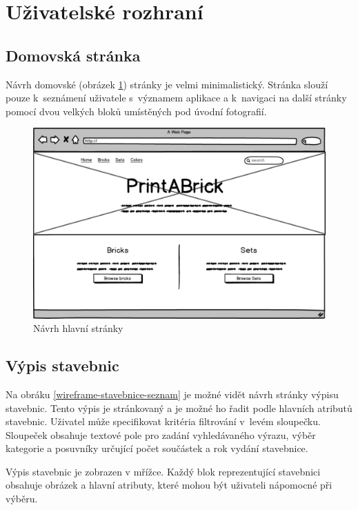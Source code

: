 \section{Uživatelské rozhraní}


\subsection{Domovská stránka}
Návrh domovské (obrázek \ref{wireframe-hlavni}) stránky je velmi minimalistický. Stránka slouží pouze k~seznámení uživatele s~významem aplikace a k~navigaci na další stránky pomocí dvou velkých bloků umístěných pod úvodní fotografií.

\begin{figure}[htbp]
    \centering
    \includegraphics[width=\textwidth,height=\textheight,keepaspectratio]{pdfs/wireframe_home.pdf}
    \caption{Návrh hlavní stránky}\label{wireframe-hlavni}
\end{figure}


\subsection{Výpis stavebnic}
Na obráku \ref{wireframe-stavebnice-seznam} je možné vidět návrh stránky výpisu stavebnic. Tento výpis je stránkovaný a je možné ho řadit podle hlavních atributů stavebnic. Uživatel může specifikovat kritéria filtrování v~levém sloupečku. Sloupeček obsahuje textové pole pro zadání vyhledávaného výrazu, výběr kategorie a posuvníky určující počet součástek a rok vydání stavebnice.

Výpis stavebnic je zobrazen v mřížce. Každý blok reprezentující stavebnici obsahuje obrázek a hlavní atributy, které mohou být uživateli nápomocné při výběru.

